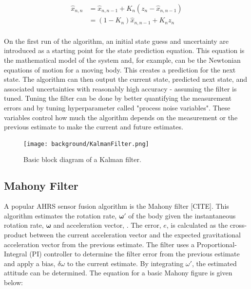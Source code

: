 \begin{equation} \label{eq:kalman_state_update_eq}
    \begin{aligned}
        \hat{x}_{n,n} &= \hat{x}_{n,n-1} + K_n(z_n - \hat{x}_{n,n-1}) \\
                      &= (1-K_n)\hat{x}_{n,n-1} + K_n z_n \\
    \end{aligned}
\end{equation}

On the first run of the algorithm, an initial state guess and uncertainty are introduced as a starting point for the state prediction equation.
This equation is the mathematical model of the system and, for example, can be the Newtonian equations of motion for a moving body.
This creates a prediction for the next state.
The algorithm can then output the current state, predicted next state, and associated uncertainties with reasonably high accuracy - assuming the filter is tuned.
Tuning the filter can be done by better quantifying the measurement errors and by tuning hyperparameter called "process noise variables".
These variables control how much the algorithm depends on the measurement or the previous estimate to make the current and future estimates.

\begin{figure}[h!]
    \caption[Kalman filter block diagram]{Basic block diagram of a Kalman filter.}
    \label{fig:kalman_filter}
    \centering
    \texttt{[image: background/KalmanFilter.png]}
\end{figure}

\subsection{Mahony Filter} \label{ssec:bkg_mahony_filter}
A popular AHRS sensor fusion algorithm is the Mahony filter [CITE].
This algorithm estimates the rotation rate, $\pmb{\omega}'$ of the body given the instantaneous rotation rate, $\pmb{\omega}$ and acceleration vector, .
The error, $e$, is calculated as the cross-product between the current acceleration vector and the expected gravitational acceleration vector from the previous estimate.
The filter uses a Proportional-Integral (PI) controller to determine the filter error from the previous estimate and apply a bias, $\delta\omega$ to the current estimate.
By integrating $\omega'$, the estimated attitude can be determined.
The equation for a basic Mahony figure is given below:

